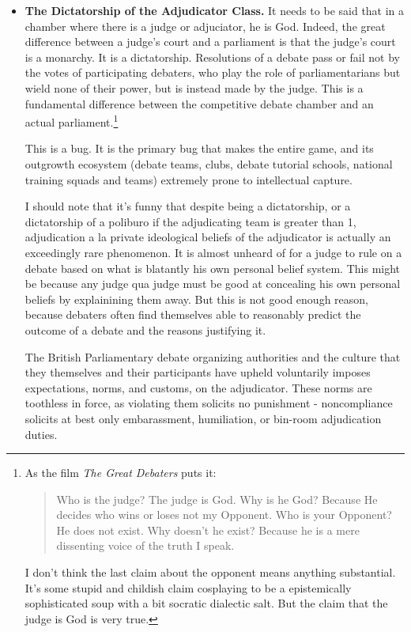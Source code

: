\begin{itemize}
    \item \textbf{The Dictatorship of the Adjudicator Class.} It needs to be said that in a chamber where there is a judge or adjuciator, he is God. Indeed, the great difference between a judge's court and a parliament is that the judge's court is a monarchy. It is a dictatorship. Resolutions of a debate pass or fail not by the votes of participating debaters, who play the role of parliamentarians but wield none of their power, but is instead made by the judge. This is a fundamental difference between the competitive debate chamber and an actual parliament.\footnote{
    As the film \textit{The Great Debaters} puts it: 
    \begin{quote}
        Who is the judge? The judge is God. Why is he God? Because He decides who wins or loses not my Opponent. Who is your Opponent? He does not exist. Why doesn’t he exist? Because he is a mere dissenting voice of the truth I speak.
    \end{quote}
    I don't think the last claim about the opponent means anything substantial. It's some stupid and childish claim cosplaying to be a epistemically sophisticated soup with a bit socratic dialectic salt. But the claim that the judge is God is very true.
    } 

This is a bug. It is the primary bug that makes the entire game, and its outgrowth ecosystem (debate teams, clubs, debate tutorial schools, national training squads and teams) extremely prone to intellectual capture.

I should note that it's funny that despite being a dictatorship, or a dictatorship of a poliburo if the adjudicating team is greater than 1, adjudication a la private ideological beliefs of the adjudicator is actually an exceedingly rare phenomenon. It is almost unheard of for a judge to rule on a debate based on what is blatantly his own personal belief system. This might be because any judge qua judge must be good at concealing his own personal beliefs by explainining them away. But this is not good enough reason, because debaters often find themselves able to reasonably predict the outcome of a debate and the reasons justifying it. 

The British Parliamentary debate organizing authorities and the culture that they themselves and their participants have upheld voluntarily imposes expectations, norms, and customs, on the adjudicator. These norms are toothless in force, as violating them solicits no punishment - noncompliance solicits at best only embarassment, humiliation, or bin-room adjudication duties. 


\end{itemize}
